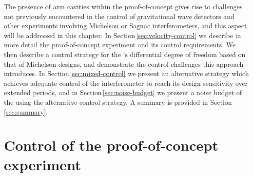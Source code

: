 




The presence of arm cavities within the proof-of-concept \SSM{} gives rise to challenges not previously encountered in the control of gravitational wave detectors and other experiments involving Michelson or Sagnac interferometers, and this aspect will be addressed in this chapter. In Section\,\ref{sec:velocity-control} we describe in more detail the proof-of-concept \SSM{} experiment and its control requirements. We then describe a control strategy for the \SSM{}'s differential degree of freedom based on that of Michelson designs, and demonstrate the control challenges this approach introduces. In Section\,\ref{sec:mixed-control} we present an alternative strategy which achieves adequate control of the interferometer to reach its design sensitivity over extended periods, and in Section\,\ref{sec:noise-budget} we present a noise budget of the \SSM{} using the alternative control strategy. A summary is provided in Section\,\ref{sec:summary}.


\section{\label{sec:ssm-control}Control of the proof-of-concept experiment}

